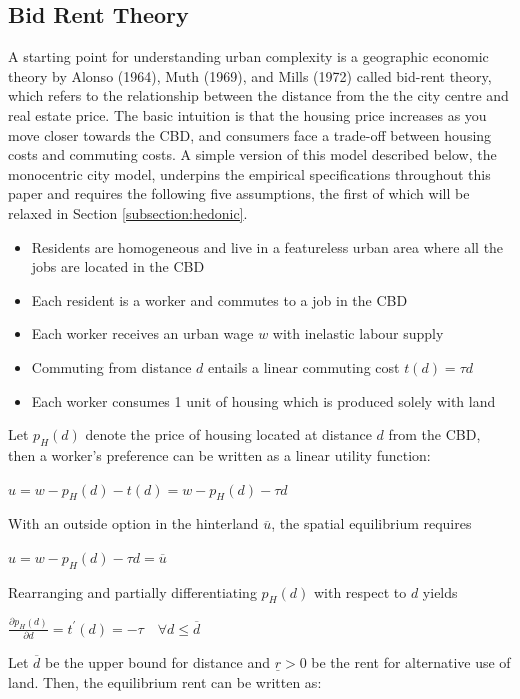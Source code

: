 \documentclass{article}
\begin{document}
\subsection{Bid Rent Theory}
A starting point for understanding urban complexity is a geographic economic theory by Alonso (1964), Muth (1969), and Mills (1972) called bid-rent theory, which refers to the relationship between the distance from the the city centre and real estate price. The basic intuition is that the housing price increases as you move closer towards the CBD, and consumers face a trade-off between housing costs and commuting costs. A simple version of this model described below, the monocentric city model, underpins the empirical specifications throughout this paper and requires the following five assumptions, the first of which will be relaxed in Section \ref{subsection:hedonic}.
\begin{itemize}
\setlength\itemsep{0.1em}
\item Residents are homogeneous and live in a featureless urban area where all the jobs are located in the CBD
\item Each resident is a worker and commutes to a job in the CBD
\item Each worker receives an urban wage $w$ with inelastic labour supply
\item Commuting from distance $d$ entails a linear commuting cost $t(d) = \tau d$
\item Each worker consumes 1 unit of housing which is produced solely  with land
\end{itemize}
Let $p_H (d)$ denote the price of housing located at distance $d$ from the CBD, then a worker's preference can be written as a linear utility function:
\begin{center}
$u = w - p _ { H } ( d ) - t ( d ) = w - p _ { H } ( d ) - \tau d$
\end{center}
With an outside option in the hinterland $\overline{u}$, the spatial equilibrium requires
\begin{center}
$u = w - p _ { H } ( d ) - \tau d = \overline { u }$
\end{center}
Rearranging and partially differentiating $p_H (d)$ with respect to $d$ yields 
\begin{center}
$\frac { \partial p _ { H } ( d ) } { \partial d } = t ^ { \prime } ( d ) = - \tau \quad \forall d \leq \overline { d }$
\end{center}
Let $\overline{d}$ be the upper bound for distance and $\underline{r} > 0$ be the rent for alternative use of land. Then, the equilibrium rent can be written as:
\end{document}
